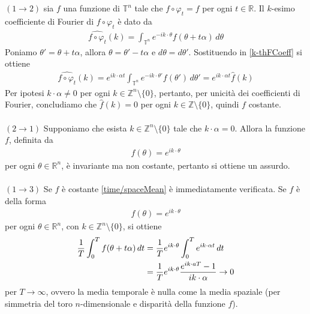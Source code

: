 \documentclass[twoside, 11pt]{amsbook}
\makeatletter
\newcommand{\0}{{(0)}}
\newcommand{\3}{{(3)}}
\theoremstyle{colonplain}
\theoremstyle{colondefinition}
\theoremstyle{colonremark}
\numberwithin{equation}{chapter}
\renewcommand{\proofname}{Dimostrazione}
\renewenvironment{proof}[1][\proofname]{\par
  \pushQED{\qed}%
  \normalfont \topsep6\p@\@plus6\p@\relax
  \trivlist
  \item[\hskip\labelsep\bfseries #1:]\ignorespaces
}{%
  \popQED\endtrivlist\@endpefalse
}
\makeatother
\begin{document}
\begin{proof} $(1 \rightarrow 2)$ sia $f$ una funzione di $\mathbb{T}^n$ tale che $f \circ \varphi_t = f$ per ogni $t \in \mathbb{R}$. Il $k$-esimo coefficiente di Fourier di $f \circ \varphi_t$ è dato da 
\begin{align}\label{k-thFCoeff}
    \widehat{f \circ \varphi_t}(k) = \int_{\mathbb{T}^n} e^{-i k \cdot \theta}f(\theta + t\alpha) \, d\theta
\end{align}
Poniamo $\theta' = \theta + t\alpha$, allora $\theta = \theta' - t\alpha$ e $d\theta = d\theta'$. Sostituendo in \eqref{k-thFCoeff} si ottiene
\begin{align}
    \widehat{f \circ \varphi_t}(k) = e^{i k \cdot \alpha t}\int_{\mathbb{T}^n} e^{-i k \cdot \theta'}f(\theta') \, d\theta' = e^{i k \cdot \alpha t}\widehat{f}(k)
\end{align}
Per ipotesi $k \cdot \alpha \neq 0$ per ogni $k \in \mathbb{Z}^n \setminus \{0\}$, pertanto, per unicità dei coefficienti di Fourier, concludiamo che $\widehat{f}(k) = 0$ per ogni $k \in \mathbb{Z} \setminus \{0\}$, quindi $f$ costante. \\ \\
$(2 \rightarrow 1)$ Supponiamo che esista $k \in \mathbb{Z}^n \setminus \{0\}$ tale che $k \cdot \alpha = 0$. Allora la funzione $f$, definita da
\begin{align}
    f(\theta) = e^{i k \cdot \theta}
\end{align}
per ogni $\theta \in \mathbb{R}^n$, è invariante ma non costante, pertanto si ottiene un assurdo. \\ \\
$(1 \rightarrow 3)$ Se $f$ è costante \eqref{time/spaceMean} è immediatamente verificata. Se $f$ è della forma
\begin{align}\label{e^iktheta}
    f(\theta) = e^{i k \cdot \theta}
\end{align}
per ogni $\theta \in \mathbb{R}^n$, con $k \in \mathbb{Z}^n \setminus \{0\}$, si ottiene
\begin{align}\label{ImmExpMean}
    \frac{1}{T}\int_0^T f(\theta + t\alpha) \, dt &= \frac{1}{T}e^{i k \cdot \theta}\int_0^T e^{i k \cdot \alpha t} \, dt \notag \\
    &= \frac{1}{T}e^{i k \cdot \theta}\frac{e^{i k \cdot aT} - 1}{ik \cdot \alpha} \rightarrow 0
\end{align}
per $T \rightarrow \infty$, ovvero la media temporale è nulla come la media spaziale (per simmetria del toro $n$-dimensionale e disparità della funzione $f$). \\

\end{proof}
\end{document}
